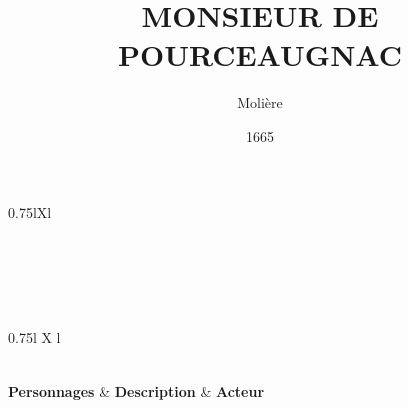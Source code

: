 \documentclass[12pt]{article}
\title{MONSIEUR DE POURCEAUGNAC}
\author{Molière}
\date{1665}
\begin{document}
\begin{xltabular}[c]{0.75\linewidth}{lXl}
  \caption*{\textbf{Conspectus Siglorum}\label{tab:conspectus-siglorum}}\\
  \\
  \\
  \\
\end{xltabular}

\newpage

\begin{xltabular}{0.75\linewidth}{l X l}
  \caption*{\textbf{Cast List}\label{tab:cast-list}}\\
  \hline
  \textbf{Personnages} & \textbf{Description} & \textbf{Acteur} \\
  \hline
  \CastTableBody
  \hline
\end{xltabular}


\newpage
\end{document}
